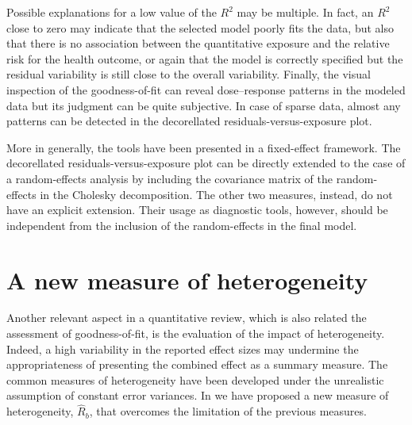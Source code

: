 \documentclass[11pt,a4paper,twoside,openany]{book}\usepackage{knitr}
\begin{document}
{Possible explanations for a low value of the $R^2$ may be multiple. In fact, an $R^2$ close to zero may indicate that the selected model poorly fits the data, but also that there is no association between the quantitative exposure and the relative risk for the health outcome, or again that the model is correctly specified but the residual variability is still close to the overall variability. Finally, the visual inspection of the goodness-of-fit can reveal dose--response patterns in the modeled data but its judgment can be quite subjective. In case of sparse data, almost any patterns can be detected in the decorellated residuals-versus-exposure plot.

More in generally, the tools have been presented in a fixed-effect framework. The decorellated residuals-versus-exposure plot can be directly extended to the case of a random-effects analysis by including the covariance matrix of the random-effects in the Cholesky decomposition. The other two measures, instead, do not have an explicit extension. Their usage as diagnostic tools, however, should be independent from the inclusion of the random-effects in the final model.


\section{A new measure of heterogeneity}

Another relevant aspect in a quantitative review, which is also related the assessment of goodness-of-fit, is the evaluation of the impact of heterogeneity. Indeed, a high variability in the reported effect sizes may undermine the appropriateness of presenting the combined effect as a summary measure. The common measures of heterogeneity have been developed under the unrealistic assumption of constant error variances. In  we have proposed a new measure of heterogeneity, $\hat R_b$, that overcomes the limitation of the previous measures.

}
\end{document}
